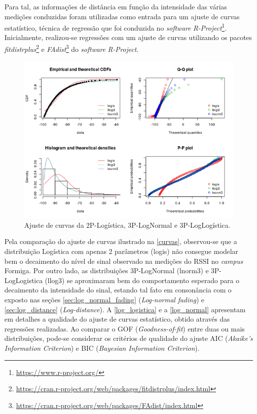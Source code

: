 \documentclass[
	12pt,				%
	twoside,			%
	a4paper,			%
	english,			%
	french,				%
	spanish,			%
	brazil				%
	]{abntex2}
\begin{document}
Para tal, as informações de distância em função da intensidade das
várias medições conduzidas foram utilizadas como entrada para um ajuste
de curvas estatístico, técnica de regressão que foi conduzida no
\emph{software} \emph{R-Project}\footnote{\url{https://www.r-project.org/}}.
Inicialmente, realizou-se regressões com um ajuste de curvas utilizando
os pacotes \emph{fitdistrplus}\footnote{\url{https://cran.r-project.org/web/packages/fitdistrplus/index.html}}
e \emph{FAdist}\footnote{\url{https://cran.r-project.org/web/packages/FAdist/index.html}}
do \emph{software} \emph{R-Project}.

\begin{figure}[!htb]
    \caption{\label{curvas} Ajuste de curvas da 2P-Logística, 3P-LogNormal e 3P-LogLogística.}
    \begin{center}
        \includegraphics[scale=0.7]{imagens/curvas.png} 
    \end{center}
\end{figure}

Pela comparação do ajuste de curvas ilustrado na \autoref{curvas},
observou-se que a distribuição Logística com apenas 2 parâmetros (logis)
não consegue modelar bem o decaimento do nível de sinal observado na
medições do RSSI no \emph{campus} Formiga. Por outro lado, as
distribuições 3P-LogNormal (lnorm3) e 3P-LogLogistica (llog3) se
aproximaram bem do comportamento esperado para o decaimento da
intensidade do sinal, estando tal fato em consonância com o exposto nas
seções \ref{sec:log_normal_fading} (\emph{Log-normal fading}) e
\ref{sec:log_distance} (\emph{Log-distance}). A \autoref{log_logistica}
e a \autoref{log_normal} apresentam em detalhes a qualidade do ajuste de
curvas estatístico, obtido através das regressões realizadas. Ao
comparar o GOF (\emph{Goodness-of-fit}) entre duas ou mais
distribuições, pode-se considerar os critérios de qualidade do ajuste
AIC (\emph{Akaike's Information Criterion}) e BIC (\emph{Bayesian
Information Criterion}).
\end{document}
